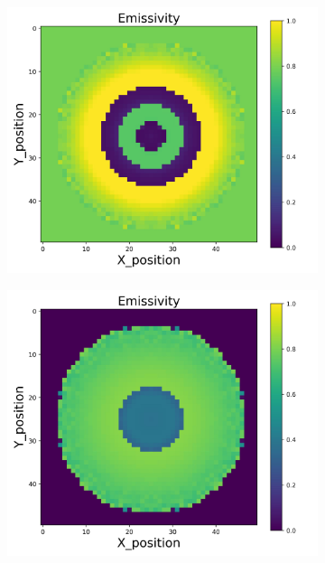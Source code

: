 \begin{figure}[p]
\begin{minipage}{\textwidth}
\begin{subfigure}{0.325\textwidth}
        \end{subfigure}
    \end{minipage}\\
    \begin{minipage}{\textwidth}
        \centering
        \begin{subfigure}{0.325\textwidth}
            \centering
            \includegraphics[width=\textwidth]{figures/raw_data/25/quad/emi_cal.jpg}
        \end{subfigure}
        \begin{subfigure}{0.325\textwidth}
            \centering
            \includegraphics[width=\textwidth]{figures/raw_data/26/quad/emi_cal.jpg}

\end{subfigure}
\end{minipage}
\end{figure}
